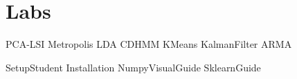 \documentclass[opener-c,labs,yellow,nociteref]{HJnewsiambook}
\begin{document}
\part{Labs} %

{PCA-LSI}
{Metropolis}
{LDA}
{CDHMM}
{KMeans}
{KalmanFilter}
{ARMA}


\begin{appendices}
{SetupStudent}
{Installation}
{NumpyVisualGuide}
{SklearnGuide}
\end{appendices}



\end{document}

